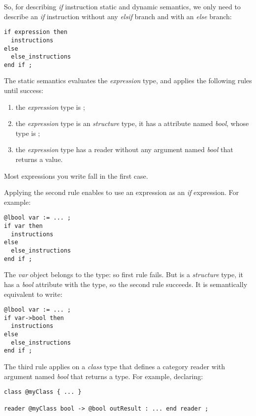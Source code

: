 So, for describing \emph{if} instruction static and dynamic semantics, we only need to describe an \emph{if} instruction without any \emph{elsif} branch and with an \emph{else} branch:
{
\begin{lstlisting}[language=galgas]
if expression then
  instructions
else
  else_instructions
end if ;
\end{lstlisting}
}

The static semantics evaluates the \emph{expression} type, and applies the following rules until success:
\begin{enumerate}
\item the \emph{expression} type is ;
\item the \emph{expression} type is an \emph{structure} type, it has a attribute named \emph{bool}, whose type is ;
\item the \emph{expression} type has a reader without any argument named \emph{bool} that returns a  value.
\end{enumerate}

Most expressions you write fall in the first case.

Applying the second rule enables to use an  expression as an \emph{if} expression. For example:
{
\begin{lstlisting}[language=galgas]
@lbool var := ... ;
if var then
  instructions
else
  else_instructions
end if ;
\end{lstlisting}
}

The \emph{var} object belongs to the  type: so first rule fails. But  is a \emph{structure} type, it has a \emph{bool} attribute with the  type, so the second rule succeeds. It is semantically equivalent to write:
{
\begin{lstlisting}[language=galgas]
@lbool var := ... ;
if var->bool then
  instructions
else
  else_instructions
end if ;
\end{lstlisting}
}

The third rule applies on a \emph{class} type that defines a category reader with argument named \emph{bool} that returns a  type. For example, declaring:
\begin{lstlisting}[language=galgas]
class @myClass { ... }

reader @myClass bool -> @bool outResult : ... end reader ;
\end{lstlisting}

